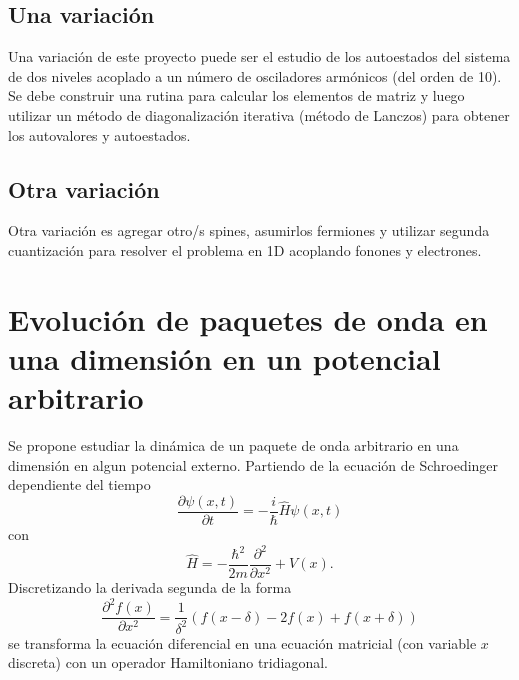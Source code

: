 \documentclass[12pt,a4paper]{article}
\begin{document}
\subsection{Una variación}
Una variación de este proyecto puede ser el estudio de los autoestados del sistema de dos niveles acoplado a un número de osciladores armónicos (del orden de 10). Se debe construir una rutina para calcular los elementos de matriz y luego utilizar un método de diagonalización iterativa (método de Lanczos) para obtener los autovalores y autoestados.

\subsection{Otra variación}
Otra variación es agregar otro/s spines, asumirlos fermiones y utilizar segunda cuantización para resolver el problema en 1D acoplando fonones y electrones.

\section{Evolución de paquetes de onda en una dimensión en un potencial arbitrario}
Se propone estudiar la dinámica de un paquete de onda arbitrario en una dimensión en algun potencial externo. Partiendo de la ecuación de Schroedinger dependiente del tiempo
\[
\frac{\partial \psi(x,t)}{\partial t}=-\frac{i}{\hbar}\hat{H}\psi(x,t)
\]
con
\[
\hat{H}=-\frac{\hbar^2}{2m}\frac{\partial^2}{\partial x^2}+V(x).
\]
Discretizando la derivada segunda de la forma
\[
\frac{\partial^2 f(x)}{\partial x^2}=\frac{1}{\delta^2}(f(x-\delta)-2f(x)+f(x+\delta))
\]
se transforma la ecuación diferencial en una ecuación matricial (con variable $x$ discreta) con un operador Hamiltoniano tridiagonal. 
\end{document}
